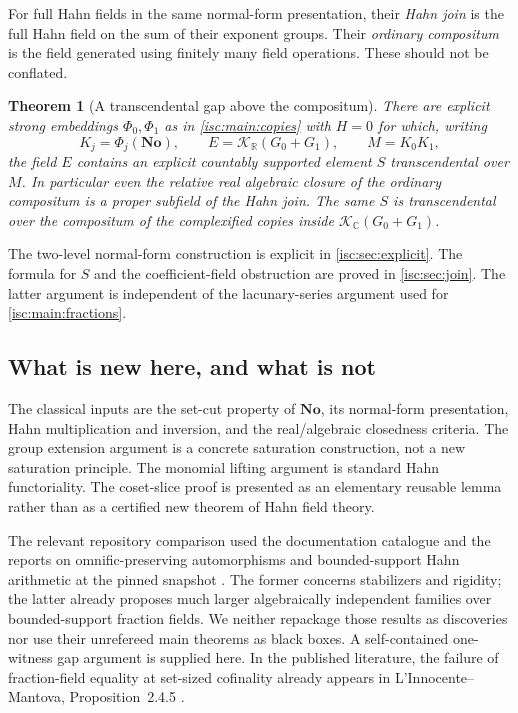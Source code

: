 \documentclass[11pt,letterpaper]{article}
\newtheorem{mainthm}{Theorem}
\theoremstyle{definition}
\theoremstyle{remark}
\newcommand{\No}{\mathbf{No}}
\newcommand{\R}{\mathbb R}
\newcommand{\C}{\mathbb C}
\newcommand{\K}[2]{\mathcal K_{#1}(#2)}
\numberwithin{equation}{section}
\begin{document}
For full Hahn fields in the same normal-form presentation, their \emph{Hahn
join} is the full Hahn field on the sum of their exponent groups. Their
\emph{ordinary compositum} is the field generated using finitely many field
operations. These should not be conflated.

\begin{mainthm}[A transcendental gap above the compositum]\label{isc:main:join}
There are explicit strong embeddings $\Phi_0,\Phi_1$ as in
\cref{isc:main:copies} with $H=0$ for which, writing
\[
 K_j=\Phi_j(\No),\qquad
 E=\K{\R}{G_0+G_1},\qquad M=K_0K_1,
\]
the field $E$ contains an explicit countably supported element $S$
transcendental over $M$. In particular even the relative real algebraic
closure of the ordinary compositum is a proper subfield of the Hahn join.
The same $S$ is transcendental over the compositum of the complexified
copies inside $\K{\C}{G_0+G_1}$.
\end{mainthm}

The two-level normal-form construction is explicit in \cref{isc:sec:explicit}.
The formula for $S$ and the coefficient-field obstruction are proved in
\cref{isc:sec:join}. The latter argument is independent of the lacunary-series
argument used for \cref{isc:main:fractions}.

\subsection{What is new here, and what is not}\label{isc:subsec:provenance}

The classical inputs are the set-cut property of $\No$, its normal-form
presentation, Hahn multiplication and inversion, and the real/algebraic
closedness criteria. The group extension argument is a concrete saturation
construction, not a new saturation principle. The monomial lifting argument
is standard Hahn functoriality. The coset-slice proof is presented as an
elementary reusable lemma rather than as a certified new theorem of Hahn
field theory.

The relevant repository comparison used the documentation catalogue and the
reports on omnific-preserving automorphisms and bounded-support Hahn
arithmetic at the pinned snapshot \cite{RepoCatalogue,RepoAuto,RepoBounded}.
The former concerns stabilizers and rigidity; the latter already proposes
much larger algebraically independent families over bounded-support fraction
fields. We neither repackage those results as discoveries nor use their
unrefereed main theorems as black boxes. A self-contained one-witness gap
argument is supplied here. In the published literature, the failure of
fraction-field equality at set-sized cofinality already appears in
L'Innocente--Mantova, Proposition~2.4.5 \cite{LM}.
\end{document}
